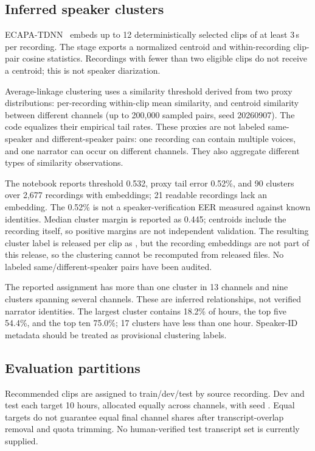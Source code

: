 \documentclass[11pt,a4paper]{article}
\begin{document}
\subsection{Inferred speaker clusters}
ECAPA-TDNN~\cite{ecapa} embeds up to 12 deterministically selected clips of
at least 3\,s per recording. The stage exports a normalized centroid and
within-recording clip-pair cosine statistics. Recordings with fewer than two
eligible clips do not receive a centroid; this is not speaker diarization.

Average-linkage clustering uses a similarity threshold derived from two
proxy distributions: per-recording within-clip mean similarity, and centroid
similarity between different channels (up to 200,000 sampled pairs, seed
20260907). The code equalizes their empirical tail rates. These proxies are
not labeled same-speaker and different-speaker pairs: one recording can
contain multiple voices, and one narrator can occur on different channels.
They also aggregate different types of similarity observations.

The notebook reports threshold 0.532, proxy tail error 0.52\%, and 90
clusters over 2,677 recordings with embeddings; 21 readable recordings lack
an embedding. The 0.52\% is not a speaker-verification EER measured against
known identities. Median cluster margin is reported as 0.445; centroids
include the recording itself, so positive margins are not independent
validation. The resulting cluster label is released per clip as
, but the recording embeddings are not part of this release,
so the clustering cannot be recomputed from released files. No labeled
same/different-speaker pairs have been audited.

The reported assignment has more than one cluster in 13 channels and nine
clusters spanning several channels. These are inferred relationships, not
verified narrator identities. The largest cluster contains 18.2\% of hours,
the top five 54.4\%, and the top ten 75.0\%; 17 clusters have less than one
hour. Speaker-ID metadata should be treated as provisional clustering labels.

\subsection{Evaluation partitions}
Recommended clips are assigned to train/dev/test by source recording.
Dev and test each target 10 hours, allocated equally across channels, with
seed . Equal targets do not guarantee equal final channel
shares after transcript-overlap removal and quota trimming. No human-verified
test transcript set is currently supplied.
\end{document}
